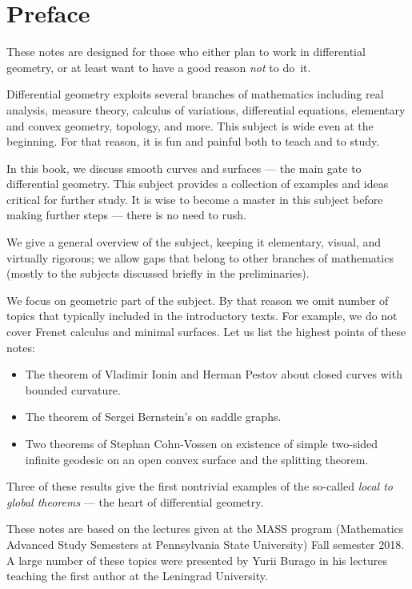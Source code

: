 
\chapter*{Preface}

These notes are designed for those who either plan to work in differential geometry,
or at least want to have a good reason \emph{not} to do~it.

Differential geometry exploits several branches of mathematics including 
real analysis, 
measure theory,
calculus of variations,
differential equations,
elementary and convex geometry,
topology, and more.
This subject is wide even at the beginning. 
For that reason, it is fun and painful both to teach and to study.

In this book, we discuss smooth curves and surfaces --- the main gate to differential geometry.
This subject provides a collection of examples and ideas critical for further study.
It is wise to become a master in this subject before making further steps --- there is no need to rush.

We give a general overview of the subject, keeping it elementary, visual, and virtually rigorous; we allow gaps that belong to other branches of mathematics (mostly to the subjects discussed briefly in the preliminaries).

We focus on geometric part of the subject.
By that reason we omit number of topics that typically included in the introductory texts.
For example, we do not cover Frenet calculus and minimal surfaces.
Let us list the highest points of these notes:
\begin{itemize}
\item The theorem of Vladimir Ionin and Herman Pestov about closed curves with bounded curvature.
\item The theorem of Sergei Bernstein's on saddle graphs.
\item Two theorems of Stephan Cohn-Vossen on existence of simple two-sided infinite geodesic on an open convex surface and the splitting theorem.
\end{itemize}
Three of these results give the first nontrivial examples of the so-called {}\emph{local to global theorems} --- the heart of differential geometry.

These notes are based on the lectures given at the MASS program (Mathematics Advanced Study Semesters at Pennsylvania State University) Fall semester 2018.
A large number of these topics were presented by Yurii Burago in his lectures teaching the first author at the Leningrad University.

